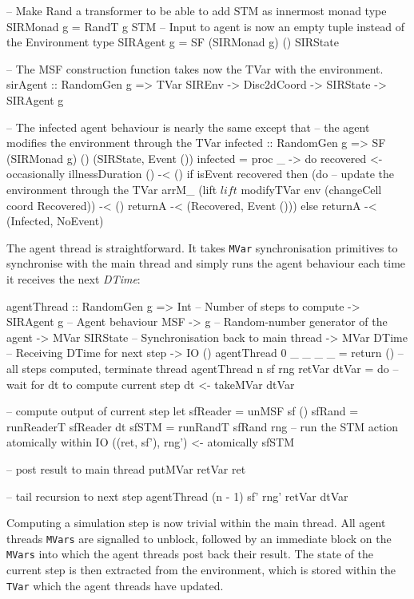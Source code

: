 \begin{HaskellCode}
-- Make Rand a transformer to be able to add STM as innermost monad
type SIRMonad g = RandT g STM
-- Input to agent is now an empty tuple instead of the Environment
type SIRAgent g = SF (SIRMonad g) () SIRState

-- The MSF construction function takes now the TVar with the environment.
sirAgent :: RandomGen g => TVar SIREnv -> Disc2dCoord -> SIRState -> SIRAgent g

-- The infected agent behaviour is nearly the same except that
-- the agent modifies the environment through the TVar
infected :: RandomGen g => SF (SIRMonad g) () (SIRState, Event ())
infected = proc _ -> do
  recovered <- occasionally illnessDuration () -< ()
  if isEvent recovered
    then (do
      -- update the environment through the TVar
      arrM_ (lift $ lift $ modifyTVar env (changeCell coord Recovered)) -< ()
      returnA -< (Recovered, Event ()))
    else returnA -< (Infected, NoEvent)
\end{HaskellCode}

The agent thread is straightforward. It takes \texttt{MVar} synchronisation primitives to synchronise with the main thread and simply runs the agent behaviour each time it receives the next \textit{DTime}:

\begin{HaskellCode}
agentThread :: RandomGen g 
            => Int             -- Number of steps to compute
            -> SIRAgent g      -- Agent behaviour MSF
            -> g               -- Random-number generator of the agent
            -> MVar SIRState   -- Synchronisation back to main thread
            -> MVar DTime      -- Receiving DTime for next step
            -> IO ()
agentThread 0 _ _ _ _ = return () -- all steps computed, terminate thread
agentThread n sf rng retVar dtVar = do
  -- wait for dt to compute current step
  dt <- takeMVar dtVar

  -- compute output of current step
  let sfReader = unMSF sf ()
      sfRand   = runReaderT sfReader dt
      sfSTM    = runRandT sfRand rng
  -- run the STM action atomically within IO
  ((ret, sf'), rng') <- atomically sfSTM 

  -- post result to main thread
  putMVar retVar ret
  
  -- tail recursion to next step 
  agentThread (n - 1) sf' rng' retVar dtVar
\end{HaskellCode}

Computing a simulation step is now trivial within the main thread. All agent threads \texttt{MVars} are signalled to unblock, followed by an immediate block on the \texttt{MVars} into which the agent threads post back their result. The state of the current step is then extracted from the environment, which is stored within the \texttt{TVar} which the agent threads have updated.

